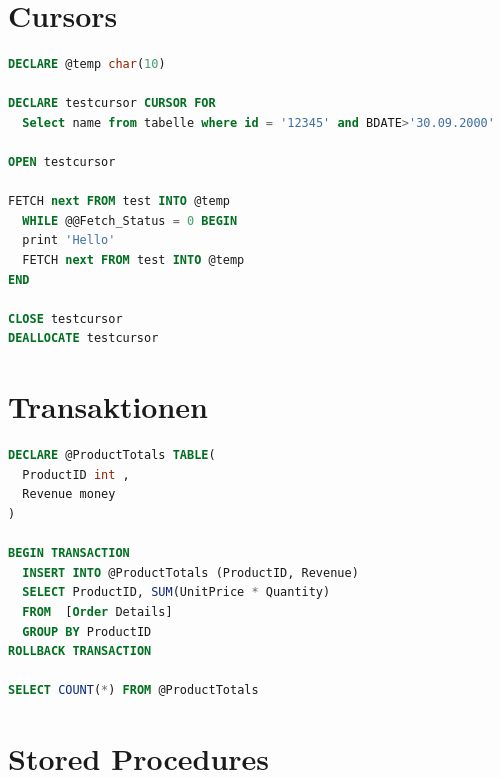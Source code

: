 \documentclass[12pt,ngerman,a4paper,index=totoc,twoside]{scrartcl}
\newcommand{\sql}[1]{\texttt{#1}}
\newcommand{\lwidth}{0.75}
\begin{document}
\section{Cursors}

\begin{center}
\begin{minipage}{\lwidth\textwidth}
\begin{lstlisting}[language={SQL},caption={Einfaches Beispiel für einen  \sql{CURSOR}},label={cursors:cursors1}]
DECLARE @temp char(10)

DECLARE testcursor CURSOR FOR
  Select name from tabelle where id = '12345' and BDATE>'30.09.2000'

OPEN testcursor

FETCH next FROM test INTO @temp
  WHILE @@Fetch_Status = 0 BEGIN
  print 'Hello'
  FETCH next FROM test INTO @temp
END

CLOSE testcursor
DEALLOCATE testcursor 
\end{lstlisting}
\end{minipage}
\end{center}

\section{Transaktionen}

\cite{odetocode:table}
 
\begin{center}
\begin{minipage}{\lwidth\textwidth}
\begin{lstlisting}[language={SQL},caption={Beispiel für eine Transaktion},label={transaction:transaction1}]
DECLARE @ProductTotals TABLE(
  ProductID int ,
  Revenue money
)

BEGIN TRANSACTION
  INSERT INTO @ProductTotals (ProductID, Revenue)
  SELECT ProductID, SUM(UnitPrice * Quantity)
  FROM  [Order Details]
  GROUP BY ProductID
ROLLBACK TRANSACTION

SELECT COUNT(*) FROM @ProductTotals
\end{lstlisting}
\end{minipage}
\end{center} 

\section{Stored Procedures} 
\end{document}
